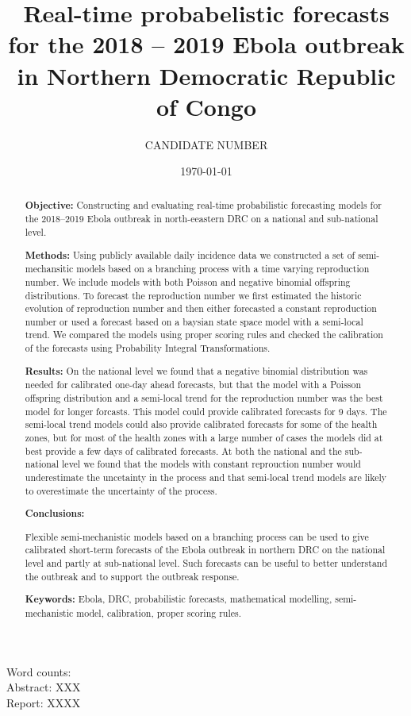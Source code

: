 \documentclass[12pt]{article}
\title{Real-time probabelistic forecasts for the 2018 -- 2019 Ebola outbreak in Northern Democratic Republic of Congo}
\author{
  CANDIDATE NUMBER
}
\date{\today}
\begin{document}
\maketitle


Word counts:\\
Abstract: XXX\\
Report: XXXX

\begin{abstract}
  {\bf Objective:} Constructing and evaluating real-time probabilistic forecasting models for the 2018--2019 Ebola outbreak in north-eeastern DRC on a national and sub-national level.
  
  \medskip
  
  {\bf Methods:} Using publicly available daily incidence data we constructed a set of semi-mechansitic models based on a branching process with a time varying reproduction number. We include models with both Poisson and negative binomial offspring distributions. To forecast the reproduction number we first estimated the historic evolution of reproduction number and then either forecasted a constant reproduction number or used a forecast based on a baysian state space model with a semi-local trend. We compared the models using proper scoring rules and checked the calibration of the forecasts using Probability Integral Transformations. 

  \medskip
  
  {\bf Results:} On the national level we found that a negative binomial distribution was needed for calibrated one-day ahead forecasts, but that the model with a Poisson offspring distribution and a semi-local trend for the reproduction number was the best model for longer forcasts. This model could provide calibrated forecasts for 9 days. The semi-local trend models could also provide calibrated forecasts for some of the health zones, but for most of the health zones with a large number of cases the models did at best provide a few days of calibrated forecasts. At both the national and the sub-national level we found that the models with constant reprouction number would underestimate the uncetainty in the process and that semi-local trend models are likely to overestimate the uncertainty of the process. 

  \medskip
  
  {\bf Conclusions:}

  Flexible semi-mechanistic models based on a branching process can be used to give calibrated short-term forecasts of the Ebola outbreak in northern DRC on the national level and partly at sub-national level. Such forecasts can be useful to better understand the outbreak and to support the outbreak response. 

  \medskip

  {\bf Keywords:} Ebola, DRC, probabilistic forecasts, mathematical modelling, semi-mechanistic model, calibration, proper scoring rules.

\end{abstract}
\end{document}
